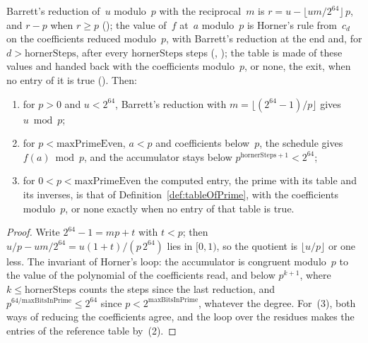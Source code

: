 \begin{lemma}\label{lem:hornerBarrett}
  \leanok
  Barrett's reduction of~$u$ modulo~$p$ with the reciprocal~$m$ is
  $r = u - \lfloor u m / 2^{64} \rfloor\, p$, and $r - p$ when $r \ge p$
  (); the value of~$f$ at~$a$ modulo~$p$ is Horner's rule
  from~$c_d$ on the coefficients reduced modulo~$p$, with Barrett's reduction at the end and, for
  $d > \mathrm{hornerSteps}$, after every $\mathrm{hornerSteps}$ steps
  (, ); the table is made of
  these values and handed back with the coefficients modulo~$p$, or none, the exit, when no entry
  of it is true (). Then:
  \begin{enumerate}
    \item for $p > 0$ and $u < 2^{64}$, Barrett's reduction with
      $m = \lfloor (2^{64} - 1)/p \rfloor$ gives $u \bmod p$;
    \item for $p < \mathrm{maxPrimeEven}$, $a < p$ and coefficients below~$p$, the schedule gives
      $f(a) \bmod p$, and the accumulator stays below $p^{\mathrm{hornerSteps} + 1} < 2^{64}$;
    \item for $0 < p < \mathrm{maxPrimeEven}$ the computed entry, the prime with its table and its
      inverses, is that of Definition~\ref{def:tableOfPrime}, with the coefficients modulo~$p$, or
      none exactly when no entry of that table is true.
  \end{enumerate}
\end{lemma}

\begin{proof}
  \leanok
  Write $2^{64} - 1 = m p + t$ with $t < p$; then $u/p - u m/2^{64} = u (1 + t)/(p\, 2^{64})$ lies
  in $[0, 1)$, so the quotient is $\lfloor u/p \rfloor$ or one less. The invariant of Horner's loop:
  the accumulator is congruent modulo~$p$ to the value of the polynomial of the coefficients read,
  and below $p^{k + 1}$, where $k \le \mathrm{hornerSteps}$ counts the steps since the last
  reduction, and $p^{64/\mathrm{maxBitsInPrime}} \le 2^{64}$ since
  $p < 2^{\mathrm{maxBitsInPrime}}$, whatever the degree. For~(3), both ways of reducing the
  coefficients agree, and the loop over the residues makes the entries of the reference table
  by~(2).
\end{proof}

